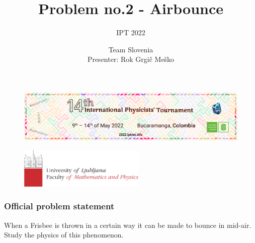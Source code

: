 \documentclass{beamer}
\title[2. Airbounce]{Problem no.2 - Airbounce}
\subtitle{IPT 2022}
\author[University of Ljubljana]{Team Slovenia\\
Presenter: Rok Grgič Meško}
\date{\vspace{-5ex}}
\begin{document}
\begin{frame}

\begin{figure}[H]
	\centering
	  \includegraphics[width=\textwidth]{naslovnica_ipt.png}
\end{figure}

\titlepage %

\vspace{-13mm}
\begin{figure}[H]
	\flushleft
	  \includegraphics[width=6cm]{fmf_logo.png}
\end{figure}

\end{frame}





\begin{frame}

\frametitle{Official problem
statement}
When a Frisbee is thrown in a certain way it can be made to bounce in mid-air. Study the physics of this phenomenon.

\end{frame}

\end{document}
